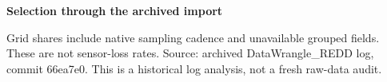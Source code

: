 \documentclass[border=7mm]{standalone}
\begin{document}
\begin{minipage}{6.6in}
\centering
{\large\bfseries Selection through the archived import\par}
\vspace{5mm}

\vspace{2mm}
{\small\raggedright Grid shares include native sampling cadence and unavailable grouped fields. These are not sensor-loss rates. Source: archived DataWrangle\_REDD log, commit 66ea7e0. This is a historical log analysis, not a fresh raw-data audit.\par}
\end{minipage}
\end{document}
